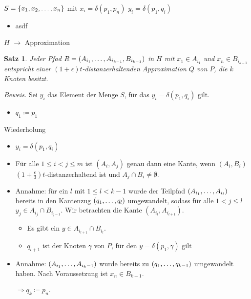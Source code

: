 \documentclass{beamer}
\newtheorem{thm}{Satz}
\begin{document}
	\begin{frame}
		$S = \{x_1, x_2, \mathellipsis, x_n\}$ mit $x_i = \delta(p_1, p_n)$
		$y_i = \delta(p_1, q_i)$ 
		
		\begin{itemize}
			\item asdf
		\end{itemize}
	
	\end{frame}
	
	\begin{frame}{$H$ $\rightarrow$ Approximation}
		\begin{thm}
			Jeder Pfad $R = (A_{i_1}, \mathellipsis, A_{i_{k-1}}, B_{i_{k-1}})$ in $H$ mit $x_1 \in A_{i_1}$ und $x_n \in B_{i_{k-1}}$ entspricht einer $(1+\epsilon)t$-distanzerhaltenden Approximation $Q$ von $P$, die $k$ Knoten besitzt.
		\end{thm}
		\textit{Beweis.}
		Sei $y_i$ das Element der Menge $S$, für das $y_i = \delta(p_1, q_i)$ gilt.
		\begin{itemize}
			\item $q_1 \coloneqq p_1$
		\end{itemize}
	\end{frame}
	
	\begin{frame}[t]
		\begin{block}{Wiederholung}
			\begin{itemize}
				\item $y_i = \delta(p_1, q_i)$
				\item Für alle $1\leq i < j \leq m$ ist $(A_i, A_j)$ genau dann eine Kante, wenn $(A_i, B_i)$ $(1 + \frac{\epsilon}{3})t$-distanzerhaltend ist und $A_j \cap B_i \neq \emptyset$.
			\end{itemize}
		\end{block}
		
		
		\vspace{10px}
		\begin{itemize}
			\item Annahme: für ein $l$ mit $1 \leq l < k-1$ wurde der Teilpfad $(A_{i_1}, \mathellipsis, A_{i_l})$ bereits in den Kantenzug $(q_1, \mathellipsis, q_l)$ umgewandelt, sodass für alle $1 < j \leq l$ $y_j \in A_{i_j} \cap B_{i_{j-1}}$.  
			Wir betrachten die Kante $(A_{i_l}, A_{i_{l+1}})$.
			\begin{itemize}
				\item Es gibt ein $y \in A_{i_{l+1}} \cap B_{i_l}$.
				\item $q_{l+1}$ ist der Knoten $\gamma$ von $P$, für den $y = \delta(p_1, \gamma)$ gilt 
			\end{itemize}
			\item Annahme: $(A_{i_1}, \mathellipsis, A_{i_k-1})$ wurde bereits zu $(q_1, \mathellipsis, q_{k-1})$ umgewandelt haben. 
			Nach Voraussetzung ist $x_n \in B_{k-1}$. 
			
			$\Rightarrow q_k \coloneqq p_n$. 
		\end{itemize}
	\end{frame}
	
\end{document}
